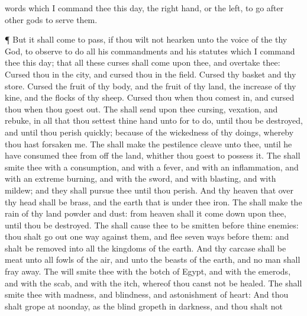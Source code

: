 {words which I
command thee this
day,
{} the right
hand, or
{} the
left, to
go
after
other
gods to
serve them.
\par }{\PP {}¶ But it shall come to pass, if thou wilt not
hearken unto the
voice of the
{} thy
God, to
observe to
do all his
commandments and his
statutes which I
command thee this
day; that all these
curses shall
come upon thee, and
overtake thee:
Cursed
{} thou
{} in the
city, and
cursed
{} thou
{} in the
field.
Cursed
{} thy
basket and thy
store.
Cursed
{} the
fruit of thy
body, and the
fruit of thy
land, the
increase of thy
kine, and the
flocks of thy
sheep.
Cursed
{} thou
{} when thou comest
in, and
cursed
{} thou
{} when thou goest
out.
The
{} shall
send upon thee
cursing,
vexation, and
rebuke, in all that thou
settest thine
hand unto for to
do, until thou be
destroyed, and until thou
perish
quickly;
because of the
wickedness of thy
doings, whereby thou hast
forsaken me.
The
{} shall make the
pestilence
cleave unto thee, until he have
consumed thee from off the
land, whither thou
goest to
possess it.
The
{} shall
smite thee with a
consumption, and with a
fever, and with an
inflammation, and with an extreme
burning, and with the
sword, and with
blasting, and with
mildew; and they shall
pursue thee until thou
perish.
And thy
heaven that
{} over thy
head shall be
brass, and the
earth that is under thee
{}
iron.
The
{} shall
make the
rain of thy
land
powder and
dust: from
heaven shall it come
down upon thee, until thou be
destroyed.
The
{} shall
cause thee to be
smitten
before thine
enemies: thou shalt go
out
one
way against them, and
flee
seven
ways
before them: and shalt be
removed into all the
kingdoms of the
earth.
And thy
carcase shall be
meat unto all
fowls of the
air, and unto the
beasts of the
earth, and no man shall fray
{}
away.
The
{} will
smite thee with the
botch of
Egypt, and with the
emerods, and with the
scab, and with the
itch, whereof thou
canst not be
healed.
The
{} shall
smite thee with
madness, and
blindness, and
astonishment of
heart:
And thou shalt
grope at
noonday, as the
blind
gropeth in
darkness, and thou shalt not
}
